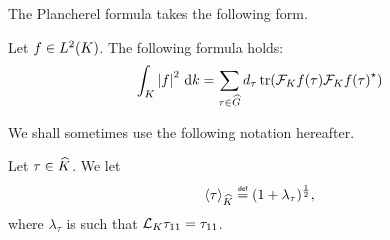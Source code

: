 The Plancherel formula takes the following form.

\begin{proposition}
    Let $f \in \Lebesgue 2 \CompactGroup$.
    The following formula holds:
    \begin{align*}
        \int_\CompactGroup \abs f^2 \dd k
        = \sum_{\tau \in \dualGroup \Group} \dimRep \tau \tr(\Fourier [\CompactGroup] f(\tau) \adj{\Fourier [\CompactGroup] f(\tau)})
    \end{align*}
\end{proposition}

We shall sometimes use the following notation hereafter.

\begin{definition}
    Let $\tau \in \dualGroup \CompactGroup$.
    We let
    \begin{align*}
        \JapaneseBracket \CompactGroup \tau \defeq (1 + \lambda_\tau)^{\frac 1 2},
    \end{align*}
    where $\lambda_\tau$ is such that $\Laplacian [\CompactGroup] \tau_{11} = \tau_{11}$.
\end{definition}
